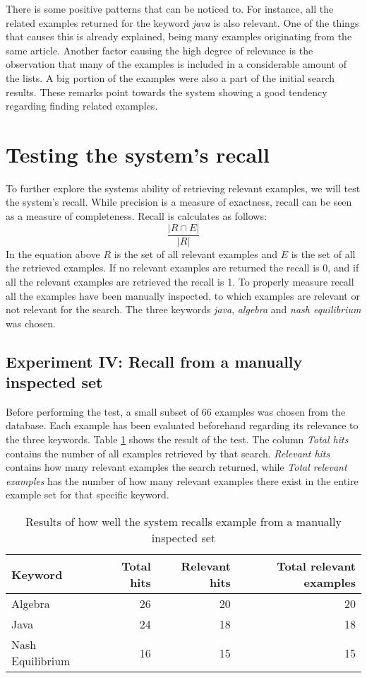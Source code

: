 There is some positive patterns that can be noticed to. For instance, all the related examples returned for the keyword \textit{java} is also relevant. One of the things that causes this is already explained, being many examples originating from the same article. Another factor causing the high degree of relevance is the observation that many of the examples is included in a considerable amount of the lists. A big portion of the examples were also a part of the initial search results. These remarks point towards the system showing a good tendency regarding finding related examples.

\section{Testing the system's recall}

To further explore the systems ability of retrieving relevant examples, we will test the system's recall. While precision is a measure of exactness, recall can be seen as a measure of completeness. Recall is calculates as follows:
\[\frac{|R \cap E |}{|R|}\]
In the equation above \(R\) is the set of all relevant examples and \(E\) is the set of all the retrieved examples. If no relevant examples are returned the recall is 0, and if all the relevant examples are retrieved the recall is 1. To properly measure recall all the examples have been manually inspected, to which examples are relevant or not relevant for the search. The three keywords \textit{java}, \textit{algebra} and \textit{nash equilibrium} was chosen.

\subsection{Experiment IV: Recall from a manually inspected set}

Before performing the test, a small subset of 66 examples was chosen from the database. Each example has been evaluated beforehand regarding its relevance to the three keywords. Table \ref{table:recall_test} shows the result of the test. The column \textit{Total hits} contains the number of all examples retrieved by that search. \textit{Relevant hits} contains how many relevant examples the search returned, while \textit{Total relevant examples} has the number of how many relevant examples there exist in the entire example set for that specific keyword.


\begin{table}[h]
\centering
\small
\begin{tabular} {|| p{10em} | r | r | r ||} 
 \hline
 Keyword & Total hits & Relevant hits & Total relevant examples \\ [0.5ex] 
 \hline
 
Algebra & 26 & 20 & 20 \\
Java & 24 & 18 & 18 \\
Nash Equilibrium & 16 & 15 & 15 \\

 \hline
\end{tabular}
\caption{Results of how well the system recalls example from a manually inspected set}
\label{table:recall_test}
\end{table}

